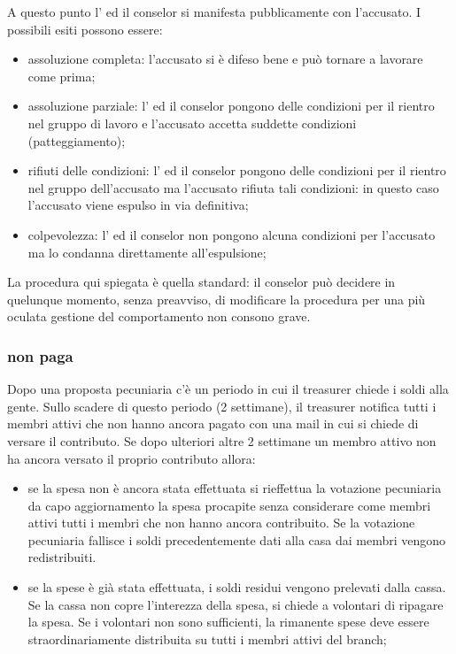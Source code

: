 A questo punto l'\EC{} ed il conselor si manifesta pubblicamente con l'accusato.
I possibili esiti possono essere:
\begin{itemize}
	\item assoluzione completa: l'accusato si è difeso bene e può tornare a lavorare come prima;
	\item assoluzione parziale: l'\EC{} ed il conselor pongono delle condizioni per il rientro nel gruppo di lavoro e l'accusato accetta suddette condizioni (patteggiamento);
	\item rifiuti delle condizioni: l'\EC{} ed il conselor pongono delle condizioni per il rientro nel gruppo dell'accusato ma l'accusato rifiuta tali condizioni: in questo caso l'accusato viene espulso in via definitiva;
	\item colpevolezza: l'\EC{} ed il conselor non pongono alcuna condizioni per l'accusato ma lo condanna direttamente all'espulsione;
\end{itemize}

La procedura qui spiegata è quella standard: il conselor può decidere in quelunque momento, senza preavviso, di modificare la procedura per una più oculata gestione del comportamento non consono grave.

\subsubsection{non paga}

Dopo una proposta pecuniaria c'è un periodo in cui il treasurer chiede i soldi alla gente.
Sullo scadere di questo periodo (2 settimane), il treasurer notifica tutti i membri attivi che non hanno ancora pagato con una mail in cui si chiede di versare il contributo. Se dopo ulteriori altre 2 settimane un membro attivo non ha ancora versato il proprio contributo allora:

\begin{itemize}
	\item se la spesa non è ancora stata effettuata si rieffettua la votazione pecuniaria da capo aggiornamento la spesa procapite senza considerare come membri attivi tutti i membri che non hanno ancora contribuito. Se la votazione pecuniaria fallisce i soldi precedentemente dati alla casa dai membri vengono redistribuiti.
	\item se la spese è già stata effettuata, i soldi residui vengono prelevati dalla cassa. Se la cassa non copre l'interezza della spesa, si chiede a volontari di ripagare la spesa. Se i volontari non sono sufficienti, la rimanente spese deve essere straordinariamente distribuita su tutti i membri attivi del branch;
\end{itemize}

